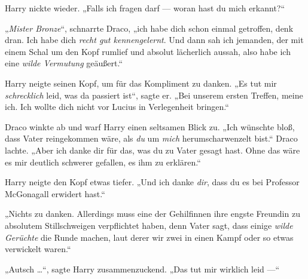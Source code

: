 Harry nickte wieder.
„Falls ich fragen darf — woran hast du mich erkannt?“

„\emph{Mister Bronze}“, schnarrte Draco, „ich habe dich schon einmal getroffen, denk dran. Ich habe dich \emph{recht gut kennengelernt}. Und dann sah ich jemanden, der mit einem Schal um den Kopf rumlief und absolut lächerlich aussah, also habe ich eine \emph{wilde Vermutung} geäußert.“

Harry neigte seinen Kopf, um für das Kompliment zu danken.
„Es tut mir \emph{schrecklich} leid, was da passiert ist“, sagte er.
„Bei unserem ersten Treffen, meine ich. Ich wollte dich nicht vor Lucius in Verlegenheit bringen.“

Draco winkte ab und warf Harry einen seltsamen Blick zu.
„Ich wünschte bloß, dass Vater reingekommen wäre, als \emph{du} um \emph{mich} herumscharwenzelt bist.“ Draco lachte.
„Aber ich danke dir für das, was du zu Vater gesagt hast. Ohne das wäre es mir deutlich schwerer gefallen, es ihm zu erklären.“

Harry neigte den Kopf etwas tiefer.
„Und ich danke \emph{dir}, dass du es bei Professor McGonagall erwidert hast.“

„Nichts zu danken. Allerdings muss eine der Gehilfinnen ihre engste Freundin zu absolutem Stillschweigen verpflichtet haben, denn Vater sagt, dass einige \emph{wilde Gerüchte} die Runde machen, laut derer wir zwei in einen Kampf oder so etwas verwickelt waren.“

„Autsch …“, sagte Harry zusammenzuckend.
„Das tut mir wirklich leid —“


